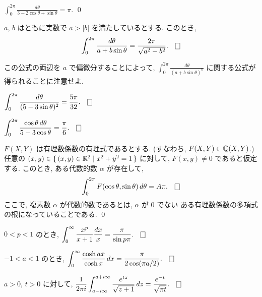 \documentclass[12pt,twoside]{jarticle}
\begin{document}
\begin{question}
  \(
    \displaystyle
    \int_0^{2\pi} \frac{d\theta}{3 - 2 \cos\theta + \sin\theta} = \pi.
  \) 
  \qed
\end{question}

\begin{question}
  $a$, $b$ はともに実数で $a > |b|$ を満たしているとする. このとき,
  \[
    \int_0^{2\pi} \frac{d\theta}{a + b\sin\theta}
    = \frac{2\pi}{\sqrt{a^2 - b^2}}.
  \qed
  \]%
\end{question}

\noindent 
この公式の両辺を $a$ で偏微分することによって, 
\(\displaystyle
  \int_0^{2\pi} \frac{d\theta}{(a + b\sin\theta)^n}
\)
に関する公式が得られることに注意せよ. 

\begin{question}
  \(\displaystyle
    \int_0^{2\pi} \frac{d\theta}{(5 - 3\sin\theta)^2}
    = \frac{5\pi}{32}.
  \qed
  \)
\end{question}

\begin{question}
  \(\displaystyle
    \int_0^{2\pi} \frac{\cos\theta\,d\theta}{5 - 3\cos\theta}
    = \frac{\pi}{6}.
  \qed
  \)
\end{question}

\begin{question}
  $F(X,Y)$ は有理数係数の有理式であるとする. %
  (すなわち, $F(X,Y) \in {\mathbb Q}(X,Y)$.) %
  任意の $(x,y)\in \{\, (x,y)\in{\mathbb R}^2 \mid x^2 + y^2 = 1 \,\}$ に対して,
  $F(x,y)\ne 0$ であると仮定する. %
  このとき, ある代数的数 $\alpha$ が存在して,
  \[
    \int_0^{2\pi} F(\cos\theta,\sin\theta)\,d\theta = A\pi.
    \qed
  \] %
  ここで, 複素数 $\alpha$ が代数的数であるとは, $\alpha$ が $0$ でない
  ある有理数係数の多項式の根になっていることである. \qed
\end{question}

\begin{question}\label{q:sekibun-1}
  $0<p<1$ のとき, 
  \(\displaystyle
    \int_0^\infty \frac{x^p}{x+1} \frac{dx}{x}
    = \frac{\pi}{\sin p\pi}.
  \qed
  \)
\end{question}

\begin{question}\label{q:sekibun-2}
  $-1 < a < 1$ のとき, 
  \(\displaystyle
    \int_0^\infty \frac{\cosh ax}{\cosh x} \,dx
    = \frac{\pi}{2\cos(\pi a/2)}.
  \qed
  \)
\end{question}

\begin{question}\label{q:sekibun-3}
  $a>0$, $t>0$ に対して, 
  \(\displaystyle
    \frac{1}{2\pi i}
    \int_{a-i\infty}^{a+i\infty} \frac{e^{tz}}{\sqrt{z+1}}\,dz
    = \frac{e^{-t}}{\sqrt{\pi t}}.
    \qed
  \)
\end{question}
\end{document}
